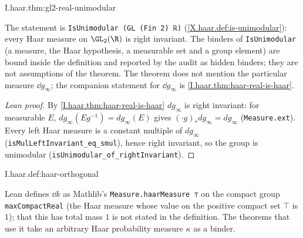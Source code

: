 \begin{theorem}[$\GL_2(\R)$ is unimodular]
\end{theorem}
\begin{tfformal}{I.haar.thm:gl2-real-unimodular}
\begin{tffidelity}
The statement is \texttt{IsUnimodular (GL (Fin 2) ℝ)} (\cref{X.haar.def:is-unimodular}): every Haar measure on $\GL_2(\R)$ is right invariant. The binders of \texttt{IsUnimodular} (a measure, the Haar hypothesis, a measurable set and a group element) are bound inside the definition and reported by the audit as hidden binders; they are not assumptions of the theorem. The theorem does not mention the particular measure $\dd g_\infty$; the companion statement for $\dd g_\infty$ is \cref{I.haar.thm:haar-real-is-haar}.
\end{tffidelity}
\end{tfformal}
\begin{proof}[Lean proof]
By \cref{I.haar.thm:haar-real-is-haar} $dg_\infty$ is right invariant: for measurable $E$, $dg_\infty(E g^{-1})=dg_\infty(E)$ gives $(\cdot g)_*dg_\infty=dg_\infty$ (\texttt{Measure.ext}). Every left Haar measure is a constant multiple of $dg_\infty$ (\texttt{isMulLeftInvariant\_eq\_smul}), hence right invariant, so the group is unimodular (\texttt{isUnimodular\_of\_rightInvariant}).
\end{proof}

\begin{definition}
\end{definition}
\begin{tfformal}{I.haar.def:haar-orthogonal}
\begin{tffidelity}
Lean defines $\dd k$ as Mathlib's \texttt{Measure.haarMeasure ⊤} on the compact group \texttt{maxCompactReal} (the Haar measure whose value on the positive compact set $\top$ is $1$); that this has total mass $1$ is not stated in the definition. The theorems that use it take an arbitrary Haar probability measure $\kappa$ as a binder.
\end{tffidelity}
\end{tfformal}

